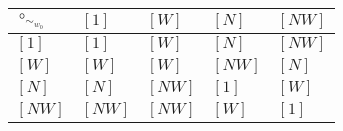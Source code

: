\begin{tabularx}{0.6\textwidth}{l|llll}
$\circ_{\sim_{w_{0}}}$ & $[1]$ & $[W]$ & $[N]$ & $[NW]$ \\
\hline
$[1]$ & $[1]$ & $[W]$ & $[N]$ & $[NW]$ \\
$[W]$ & $[W]$ & $[W]$ & $[NW]$ & $[N]$ \\
$[N]$ & $[N]$ & $[NW]$ & $[1]$ & $[W]$ \\
$[NW]$ & $[NW]$ & $[NW]$ & $[W]$ & $[1]$ \\
\end{tabularx}
